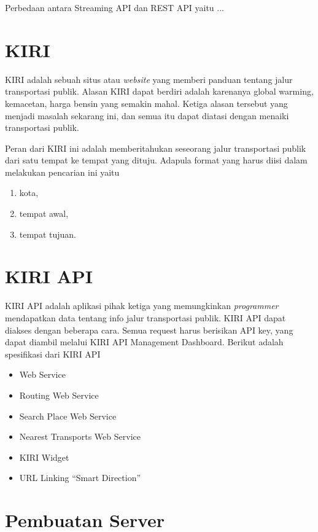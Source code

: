 Perbedaan antara Streaming API dan REST API yaitu ...

\section{KIRI}
\label{sec:kiri}
KIRI adalah sebuah situs atau \textit{website} yang memberi panduan tentang jalur transportasi publik. Alasan KIRI dapat berdiri adalah karenanya global warming, kemacetan, harga bensin yang semakin mahal. Ketiga alasan tersebut yang menjadi masalah sekarang ini, dan semua itu dapat diatasi dengan menaiki transportasi publik. 

Peran dari KIRI ini adalah memberitahukan seseorang jalur transportasi publik dari satu tempat ke tempat yang dituju. Adapula format yang harus diisi dalam melakukan pencarian ini yaitu
\begin{enumerate}
	\item kota,
	\item tempat awal,
	\item tempat tujuan.
\end{enumerate}

\section{KIRI API}
KIRI API adalah aplikasi pihak ketiga yang memungkinkan \textit{programmer} mendapatkan data tentang info jalur transportasi publik. KIRI API dapat diakses dengan beberapa cara. Semua request harus berisikan API key, yang dapat diambil melalui KIRI API Management Dashboard. Berikut adalah spesifikasi dari KIRI API

\begin{itemize}
	\item Web Service
	\item Routing Web Service
	\item Search Place Web Service
	\item Nearest Transports Web Service
	\item KIRI Widget
	\item URL Linking “Smart Direction”
\end{itemize}


\section{Pembuatan Server}